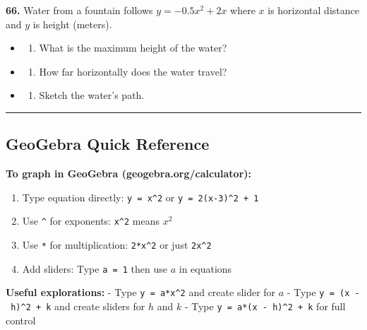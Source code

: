 \documentclass[
  11pt,
]{article}
\providecommand{\tightlist}{%
  \setlength{\itemsep}{0pt}\setlength{\parskip}{0pt}}
\begin{document}
\textbf{66.} Water from a fountain follows \(y = -0.5x^2 + 2x\) where
\(x\) is horizontal distance and \(y\) is height (meters).

\begin{itemize}
\item
  \begin{enumerate}
  \def\labelenumi{(\alph{enumi})}
  \tightlist
  \item
    What is the maximum height of the water?
  \end{enumerate}
\item
  \begin{enumerate}
  \def\labelenumi{(\alph{enumi})}
  \setcounter{enumi}{1}
  \tightlist
  \item
    How far horizontally does the water travel?
  \end{enumerate}
\item
  \begin{enumerate}
  \def\labelenumi{(\alph{enumi})}
  \setcounter{enumi}{2}
  \tightlist
  \item
    Sketch the water's path.
  \end{enumerate}
\end{itemize}

\begin{center}\rule{0.5\linewidth}{0.5pt}\end{center}

\hypertarget{geogebra-quick-reference}{%
\subsection{GeoGebra Quick Reference}\label{geogebra-quick-reference}}

\textbf{To graph in GeoGebra (geogebra.org/calculator):}

\begin{enumerate}
\def\labelenumi{\arabic{enumi}.}
\tightlist
\item
  Type equation directly: \texttt{y\ =\ x\^{}2} or
  \texttt{y\ =\ 2(x-3)\^{}2\ +\ 1}
\item
  Use \texttt{\^{}} for exponents: \texttt{x\^{}2} means \(x^2\)
\item
  Use \texttt{*} for multiplication: \texttt{2*x\^{}2} or just
  \texttt{2x\^{}2}
\item
  Add sliders: Type \texttt{a\ =\ 1} then use \(a\) in equations
\end{enumerate}

\textbf{Useful explorations:} - Type \texttt{y\ =\ a*x\^{}2} and create
slider for \(a\) - Type \texttt{y\ =\ (x\ -\ h)\^{}2\ +\ k} and create
sliders for \(h\) and \(k\) - Type \texttt{y\ =\ a*(x\ -\ h)\^{}2\ +\ k}
for full control
\end{document}

